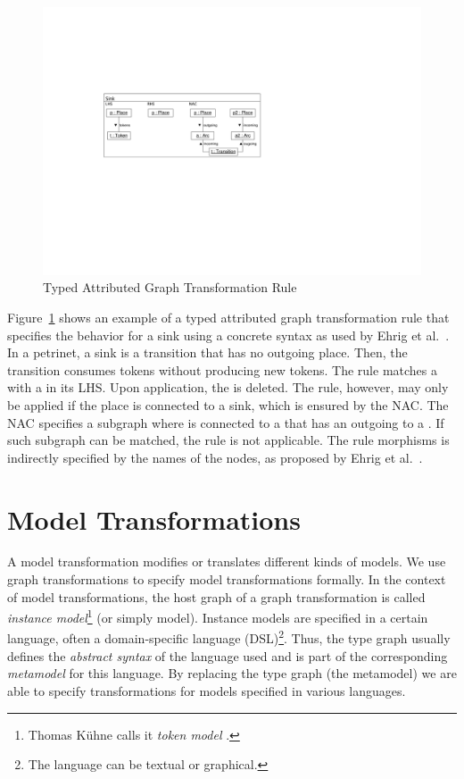 \begin{figure}[htb]
  \centering
  \includegraphics[scale=1]{figures/TypedGTRule}
  \caption{Typed Attributed Graph Transformation Rule}
  \label{fig:typedGTRule}
\end{figure}

Figure~\ref{fig:typedGTRule} shows an example of a typed attributed graph transformation rule that specifies the behavior for a sink using a concrete syntax as used by Ehrig et al.~\cite{EEPT06}.
In a petrinet, a sink is a transition that has no outgoing place.
Then, the transition consumes tokens without producing new tokens.
The rule matches a  with a  in its LHS.
Upon application, the  is deleted.
The rule, however, may only be applied if the place  is connected to a sink, which is ensured by the NAC.
The NAC specifies a subgraph where  is connected to a  that has an outgoing  to a .
If such subgraph can be matched, the rule is not applicable.
The rule morphisms is indirectly specified by the names of the nodes, as proposed by Ehrig et al.~\cite{EEPT06}.


\section{Model Transformations}
\label{sec:modelTransformation}

A model transformation modifies or translates different kinds of models.
We use graph transformations to specify model transformations formally.
In the context of model transformations, the host graph of a graph transformation is called \emph{instance model}\footnote{Thomas K\"{u}hne calls it \emph{token model} \cite{Kue06}.} (or simply model).
Instance models are specified in a certain language, often a domain-specific language (DSL)\footnote{The language can be textual or graphical.}.
Thus, the type graph usually defines the \emph{abstract syntax} of the language used and is part of the corresponding \emph{metamodel} \cite{Kue06} for this language.
By replacing the type graph (the metamodel) we are able to specify transformations for models specified in various languages.

